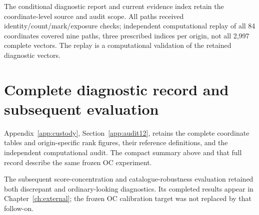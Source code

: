 The conditional diagnostic report and current evidence index retain the coordinate-level source and audit scope. All paths received identity/count/mark/exposure checks; independent computational replay of all 84 coordinates covered nine paths, three prescribed indices per origin, not all 2,997 complete vectors. The replay is a computational validation of the retained diagnostic vectors.



\section{Complete diagnostic record and subsequent evaluation}
Appendix~\ref{app:custody}, Section~\ref{app:audit12}, retains the complete coordinate tables and origin-specific rank figures, their reference definitions, and the independent computational audit. The compact summary above and that full record describe the same frozen OC experiment.

The subsequent score-concentration and catalogue-robustness evaluation retained both discrepant and ordinary-looking diagnostics. Its completed results appear in Chapter~\ref{ch:external}; the frozen OC calibration target was not replaced by that follow-on.


